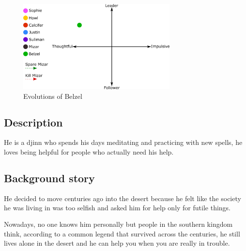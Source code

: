 \begin{figure}[H]
   \centering
   \includegraphics[width=8cm]{Images/Evolutions/belzelEvolution}
   \caption{Evolutions of Belzel}
\end{figure}

\subsection{Description}
He is a djinn who spends his days meditating and practicing with new spells, he loves being helpful for people who actually need his help. 

\subsection{Background story}
He decided to move centuries ago into the desert because he felt like the society he was living in was too selfish and asked him for help only for futile things.

Nowadays, no one knows him personally but people in the southern kingdom think, according to a common legend that survived across the centuries, he still lives alone in the desert and he can help you when you are really in trouble.
